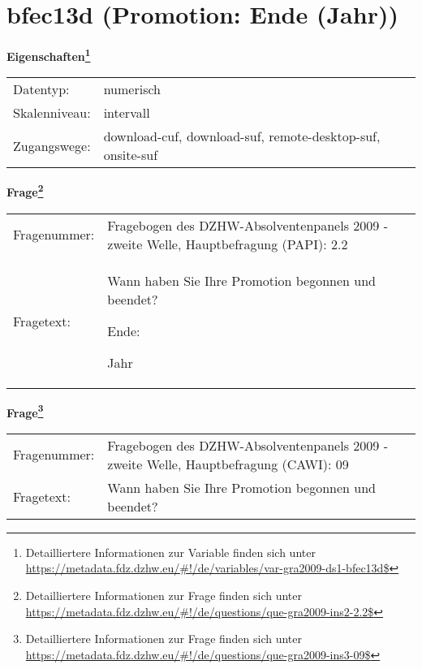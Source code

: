 
    \setcounter{footnote}{0}

    \vspace*{-1.8cm}
	\section{bfec13d (Promotion: Ende (Jahr))}
	\label{section:bfec13d}



    \vspace*{0.5cm}
    \noindent\textbf{Eigenschaften\footnote{Detailliertere Informationen zur Variable finden sich unter
		\url{https://metadata.fdz.dzhw.eu/\#!/de/variables/var-gra2009-ds1-bfec13d$}}}\\
	\begin{tabularx}{\hsize}{@{}lX}
	Datentyp: & numerisch \\
	Skalenniveau: & intervall \\
	Zugangswege: &
	  download-cuf, 
	  download-suf, 
	  remote-desktop-suf, 
	  onsite-suf
 \\
    \end{tabularx}



				\vspace*{0.5cm}
                \noindent\textbf{Frage\footnote{Detailliertere Informationen zur Frage finden sich unter
		              \url{https://metadata.fdz.dzhw.eu/\#!/de/questions/que-gra2009-ins2-2.2$}}}\\
				\begin{tabularx}{\hsize}{@{}lX}
					Fragenummer: &
					  Fragebogen des DZHW-Absolventenpanels 2009 - zweite Welle, Hauptbefragung (PAPI):
					  2.2
 \\
					Fragetext: & Wann haben Sie Ihre Promotion begonnen und beendet?\par  Ende:\par  Jahr \\
				\end{tabularx}
				\vspace*{0.5cm}
                \noindent\textbf{Frage\footnote{Detailliertere Informationen zur Frage finden sich unter
		              \url{https://metadata.fdz.dzhw.eu/\#!/de/questions/que-gra2009-ins3-09$}}}\\
				\begin{tabularx}{\hsize}{@{}lX}
					Fragenummer: &
					  Fragebogen des DZHW-Absolventenpanels 2009 - zweite Welle, Hauptbefragung (CAWI):
					  09
 \\
					Fragetext: & Wann haben Sie Ihre Promotion begonnen und beendet? \\
				\end{tabularx}





